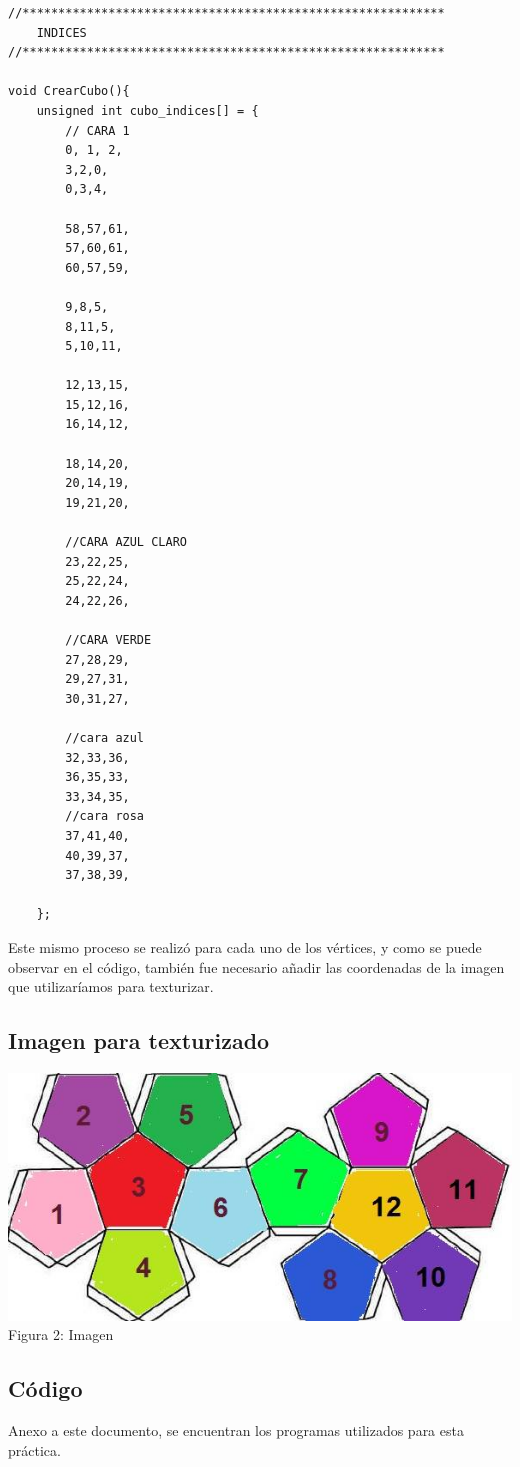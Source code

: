 \documentclass[12pt, a4paper]{article}
\begin{document}
\begin{verbatim}
//***********************************************************	
	INDICES
//***********************************************************	

void CrearCubo(){
	unsigned int cubo_indices[] = {
		// CARA 1
		0, 1, 2,
		3,2,0,
		0,3,4,

		58,57,61,
		57,60,61,
		60,57,59,

		9,8,5,
		8,11,5,
		5,10,11,

		12,13,15,
		15,12,16,
		16,14,12,

		18,14,20,
		20,14,19,
		19,21,20,
		
		//CARA AZUL CLARO 
		23,22,25,
		25,22,24,
		24,22,26,
		
		//CARA VERDE 
		27,28,29,
		29,27,31,
		30,31,27,
		
		//cara azul
		32,33,36,
		36,35,33,
		33,34,35,
		//cara rosa
		37,41,40,
		40,39,37,
		37,38,39,
	
	};
\end{verbatim}
\vspace{.1cm}
Este mismo proceso se realizó para cada uno de los vértices, y como se puede observar en el código, también fue necesario añadir las coordenadas de la imagen que utilizaríamos para texturizar. 
\subsection{Imagen para texturizado}
\vspace{.5cm}
\justify
\centering 
		\includegraphics[scale = .54]{img/dod.jpg}\\[.05cm] %
		Figura 2: Imagen\\[.65cm]

 \raggedright 	
\justify

\subsection{Código}
Anexo a este documento, se encuentran los programas utilizados para esta práctica.\\[.1cm]	
\end{document}
